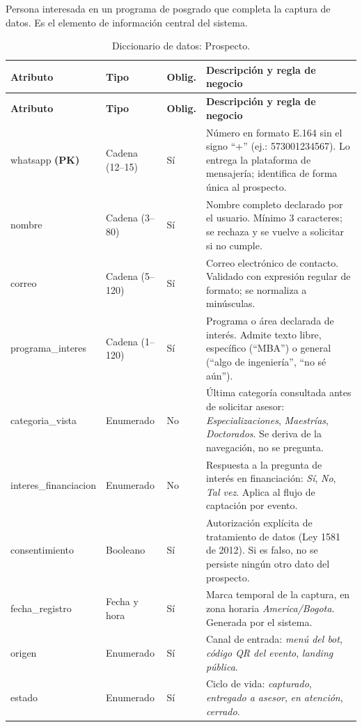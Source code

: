 \documentclass[12pt,a4paper]{report}
\newcommand{\tablacompacta}{\setstretch{1.1}\small}
\newcommand{\cabecera}[1]{\rowcolor{filacabecera}#1}
\begin{document}
Persona interesada en un programa de posgrado que completa la captura de datos. Es el elemento de
información central del sistema.

{\tablacompacta
\begin{longtable}{p{3.1cm}p{2.2cm}p{1.3cm}p{6.0cm}}
\caption{Diccionario de datos: Prospecto.}\label{tab:dd-prospecto}\\
\toprule
\cabecera{\textbf{Atributo}} & \textbf{Tipo} & \textbf{Oblig.} & \textbf{Descripción y regla de negocio} \\
\midrule
\endfirsthead
\toprule
\textbf{Atributo} & \textbf{Tipo} & \textbf{Oblig.} & \textbf{Descripción y regla de negocio} \\
\midrule
\endhead
\bottomrule
\endfoot
whatsapp \textbf{(PK)} & Cadena (12--15) & Sí & Número en formato E.164 sin el signo ``+'' (ej.: 573001234567). Lo entrega la plataforma de mensajería; identifica de forma única al prospecto. \\
nombre & Cadena (3--80) & Sí & Nombre completo declarado por el usuario. Mínimo 3 caracteres; se rechaza y se vuelve a solicitar si no cumple. \\
correo & Cadena (5--120) & Sí & Correo electrónico de contacto. Validado con expresión regular de formato; se normaliza a minúsculas. \\
programa\_interes & Cadena (1--120) & Sí & Programa o área declarada de interés. Admite texto libre, específico (``MBA'') o general (``algo de ingeniería'', ``no sé aún''). \\
categoria\_vista & Enumerado & No & Última categoría consultada antes de solicitar asesor: \textit{Especializaciones}, \textit{Maestrías}, \textit{Doctorados}. Se deriva de la navegación, no se pregunta. \\
interes\_financiacion & Enumerado & No & Respuesta a la pregunta de interés en financiación: \textit{Sí}, \textit{No}, \textit{Tal vez}. Aplica al flujo de captación por evento. \\
consentimiento & Booleano & Sí & Autorización explícita de tratamiento de datos (Ley 1581 de 2012). Si es falso, no se persiste ningún otro dato del prospecto. \\
fecha\_registro & Fecha y hora & Sí & Marca temporal de la captura, en zona horaria \textit{America/Bogota}. Generada por el sistema. \\
origen & Enumerado & Sí & Canal de entrada: \textit{menú del bot}, \textit{código QR del evento}, \textit{landing pública}. \\
estado & Enumerado & Sí & Ciclo de vida: \textit{capturado}, \textit{entregado a asesor}, \textit{en atención}, \textit{cerrado}. \\
\end{longtable}}
\end{document}
